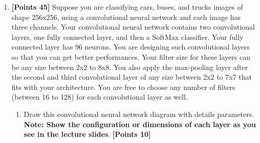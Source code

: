 \documentclass[12pt]{article}
\begin{document}
\begin{enumerate}
    \item \textbf{[Points 45]} Suppose you are classifying cars, buses, and
          trucks images of shape 256x256, using a convolutional neural network and
          each image has three channels. Your convolutional neural network contains
          two convolutional layers, one fully connected layer, and then a SoftMax
          classifier. Your fully connected layer has 96 neurons. You are designing
          such convolutional layers so that you can get better performances. Your
          filter size for these layers can be any size between 2x2 to 8x8. You also
          apply the max-pooling layer after the second and third convolutional layer
          of any size between 2x2 to 7x7 that fits with your architecture. You are
          free to choose any number of filters (between 16 to 128) for each
          convolutional layer as well.
          \begin{enumerate}
              \item Draw this convolutional neural network diagram with
                    details parameters. \textbf{Note: Show the configuration
                        or dimensions of each layer as you see in the lecture
                        slides}. \textbf{[Points 10]}


\end{enumerate}
\end{enumerate}
\end{document}
